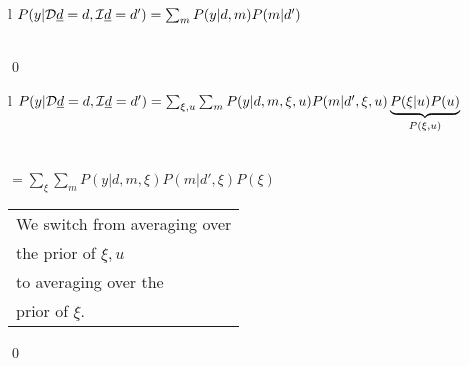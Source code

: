 \begin{claim}
\label{cl-decMediationSimple}
\decMediationSimple
\end{claim}
\proof
\begin{longtable}{l}
\color{red}
$P(y|{\cal D}{\underline{d}}=d,{\cal I}{\underline{d}}=d')=
\sum_{m}
P(y|d,m)P(m|d')$
\\
\\
\end{longtable}
\qed

\begin{claim}
\label{cl-decMediationPlus}
\decMediationPlus
\end{claim}
\proof
\begin{longtable}{l}
\color{red}
$P(y|{\cal D}{\underline{d}}=d,{\cal I}{\underline{d}}=d')=
\sum_{\xi, u}
\sum_{m}
P(y|d,m,\xi, u)P(m|d', \xi, u)
\underbrace{P(\xi|u)P(u)}_{P(\xi, u)}$
\\
\\
\\
\color{red}
$=
\sum_{\xi}
\sum_{m}
P(y|d,m,\xi)P(m|d', \xi)
P(\xi)$
\\
\xymatrix{\\=}
\begin{tabular}{l}
We switch from averaging over\\ the
prior of $\xi, u$\\
to averaging over the\\
prior of $\xi$.
\end{tabular}
\end{longtable}
\qed

